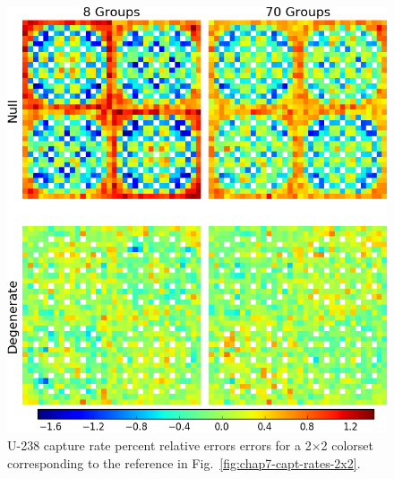 \begin{figure}[h!]
\centering
\includegraphics[width=\linewidth]{figures/quantification/2x2/capt-err}
\vspace{2mm}
\caption[U-238 capture rate errors for a 2$\times$2 colorset]{U-238 capture rate percent relative errors errors for a 2$\times$2 colorset corresponding to the reference in Fig.~\ref{fig:chap7-capt-rates-2x2}.}
\label{fig:chap8-2x2-capt-err}
\end{figure}

\clearpage

